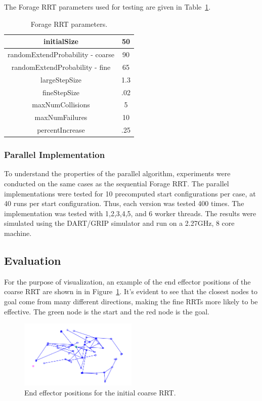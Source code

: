 \documentclass[conference]{IEEEtran}
\begin{document}
The Forage RRT parameters used for testing are given in Table~\ref{tab:ForageParams}.

\begin{table}
	\centering
	\begin{tabular}{| c | c | }
        	\hline
		initialSize & 50 \\ \hline
  		randomExtendProbability - coarse & 90 \\ \hline
  		randomExtendProbability - fine & 65 \\ \hline
  		largeStepSize & 1.3\\ \hline
  		fineStepSize & .02\\ \hline
  		maxNumCollisions & 5\\ \hline
  		maxNumFailures & 10\\ \hline
		percentIncrease & .25\\ \hline 
	\end{tabular}
	\caption{Forage RRT parameters.} 
	\label{tab:ForageParams}
\end{table}

\subsubsection{Parallel Implementation}
To understand the properties of the parallel algorithm, experiments were conducted on the same cases as the sequential Forage RRT. The
parallel implementations were tested for 10 precomputed start configurations per case, at 40 runs per start configuration. Thus, each
version was tested 400 times. The implementation was tested with 1,2,3,4,5, and 6 worker threads. The results were simulated using the
DART/GRIP simulator and run on a 2.27GHz, 8 core machine.

\subsection{Evaluation}
For the purpose of visualization, an example of the end effector positions of the coarse RRT are shown in in Figure~\ref{fig:CoarseRRT}.
It's evident to see that the closest nodes to goal come from many different directions, making the fine RRTs more likely to be effective.
The green node is the start and the red node is the goal.

\begin{figure}[h!]
  \centering
    \includegraphics[width=0.5\textwidth]{figures/coarseRRTExample.png}
  \caption{End effector positions for the initial coarse RRT. \label{fig:CoarseRRT} }
\end{figure}
\end{document}
